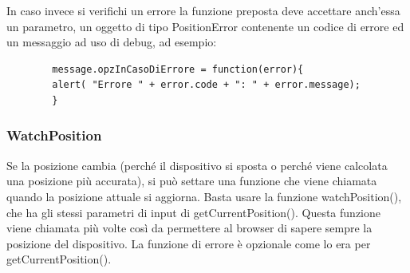 \documentclass[italian]{article}
\begin{document}
	\begin{flushleft}
		In caso invece si verifichi un errore la funzione preposta deve accettare anch’essa un parametro, un oggetto di tipo PositionError  contenente un codice di errore ed un messaggio ad uso di debug, ad esempio:
	\end{flushleft}
	\begin{lstlisting}
		message.opzInCasoDiErrore = function(error){ 
		alert( "Errore " + error.code + ": " + error.message);
		}
	\end{lstlisting}

	\subsubsection{WatchPosition}
	Se la posizione cambia (perché il dispositivo si sposta o perché viene calcolata una posizione più accurata), si può settare una funzione che viene chiamata quando la posizione attuale si aggiorna. Basta usare la funzione watchPosition(), che ha gli stessi parametri di input di getCurrentPosition(). Questa funzione viene chiamata più volte così da permettere al browser di sapere sempre la posizione del dispositivo. La funzione di errore è opzionale come lo era per getCurrentPosition().
	
\end{document}
